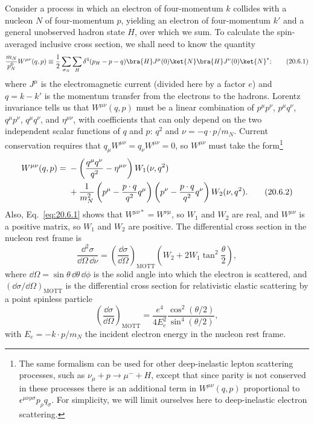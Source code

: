 Consider a process in which an electron of four-momentum $k$ collides with a nucleon $N$ of four-momentum $p$, yielding an electron of four-momentum $k'$ and a general unobserved hadron state $H$, over which we sum. To calculate the spin-averaged inclusive cross section, we shall need to know the quantity
\begin{equation}
\frac{m_N}{p_N^0}W^{\mu\nu}(q,p)
\equiv
\frac12\sum_{\sigma_N}\sum_H
\delta^4(p_H-p-q)
\bra{H}J^\mu(0)\ket{N}
\bra{H}J^\nu(0)\ket{N}^{*};
\tag{20.6.1}\label{eq:20.6.1}
\end{equation}
where $J^\mu$ is the electromagnetic current (divided here by a factor $e$) and $q=k-k'$ is the momentum transfer from the electrons to the hadrons. Lorentz invariance tells us that $W^{\mu\nu}(q,p)$ must be a linear combination of $p^\mu p^\nu$, $p^\mu q^\nu$, $q^\mu p^\nu$, $q^\mu q^\nu$, and $\eta^{\mu\nu}$, with coefficients that can only depend on the two independent scalar functions of $q$ and $p$: $q^2$ and $\nu=-q\cdot p/m_N$. Current conservation requires that $q_\mu W^{\mu\nu}=q_\nu W^{\mu\nu}=0$, so $W^{\mu\nu}$ must take the form\footnote{The same formalism can be used for other deep-inelastic lepton scattering processes, such as $\nu_\mu+p\to\mu^-+H$, except that since parity is not conserved in these processes there is an additional term in $W^{\mu\nu}(q,p)$ proportional to $\epsilon^{\mu\nu\rho\sigma}p_\rho q_\sigma$. For simplicity, we will limit ourselves here to deep-inelastic electron scattering.}
\begin{align}
W^{\mu\nu}(q,p)
={}&-\left(\frac{q^\mu q^\nu}{q^2}-\eta^{\mu\nu}\right)
W_1(\nu,q^2)
\notag\\
&+\frac{1}{m_N^2}
\left(p^\mu-\frac{p\cdot q}{q^2}q^\mu\right)
\left(p^\nu-\frac{p\cdot q}{q^2}q^\nu\right)
W_2(\nu,q^2).
\tag{20.6.2}\label{eq:20.6.2}
\end{align}
Also, Eq.~\eqref{eq:20.6.1} shows that $W^{\mu\nu *}=W^{\nu\mu}$, so $W_1$ and $W_2$ are real, and $W^{\mu\nu}$ is a positive matrix, so $W_1$ and $W_2$ are positive. The differential cross section in the nucleon rest frame is
\begin{equation}
\frac{\dd^2\sigma}{\dd\Omega\,\dd\nu}
=
\left(\frac{\dd\sigma}{\dd\Omega}\right)_{\mathrm{MOTT}}
\left(W_2+2W_1\tan^2\frac{\theta}{2}\right),
\tag{20.6.3}\label{eq:20.6.3}
\end{equation}
where $\dd\Omega=\sin\theta\,\dd\theta\,\dd\phi$ is the solid angle into which the electron is scattered, and $(\dd\sigma/\dd\Omega)_{\mathrm{MOTT}}$ is the differential cross section for relativistic elastic scattering by a point spinless particle
\begin{equation}
\left(\frac{\dd\sigma}{\dd\Omega}\right)_{\mathrm{MOTT}}
=
\frac{e^4}{4E_e^2}
\frac{\cos^2(\theta/2)}{\sin^4(\theta/2)},
\tag{20.6.4}\label{eq:20.6.4}
\end{equation}
with $E_e=-k\cdot p/m_N$ the incident electron energy in the nucleon rest frame.


